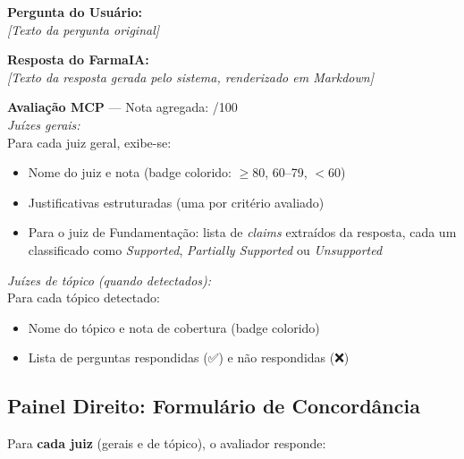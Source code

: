 \documentclass[12pt,a4paper]{article}
\begin{document}
\begin{framed}
\noindent\textbf{Pergunta do Usuário:}\\[2pt]
\textit{[Texto da pergunta original]}
\end{framed}

\begin{framed}
\noindent\textbf{Resposta do FarmaIA:}\\[2pt]
\textit{[Texto da resposta gerada pelo sistema, renderizado em Markdown]}
\end{framed}

\begin{framed}
\noindent\textbf{Avaliação MCP} --- Nota agregada: \framebox[2cm]{\rule{0pt}{5mm}}/100\\[4pt]

\noindent\textit{Juízes gerais:}\\[2pt]
Para cada juiz geral, exibe-se:
\begin{itemize}[leftmargin=12pt,itemsep=2pt]
  \item Nome do juiz e nota (badge colorido: {\color{farmaigreen}$\geq$80},
    {\color{evalamber}60--79}, {\color{evalred}$<$60})
  \item Justificativas estruturadas (uma por critério avaliado)
  \item Para o juiz de Fundamentação: lista de \textit{claims}
    extraídos da resposta, cada um classificado como
    {\color{farmaigreen}\textit{Supported}},
    {\color{evalamber}\textit{Partially Supported}} ou
    {\color{evalred}\textit{Unsupported}}
\end{itemize}

\noindent\textit{Juízes de tópico (quando detectados):}\\[2pt]
Para cada tópico detectado:
\begin{itemize}[leftmargin=12pt,itemsep=2pt]
  \item Nome do tópico e nota de cobertura (badge colorido)
  \item Lista de perguntas respondidas (✅) e não respondidas (❌)
\end{itemize}
\end{framed}

\vspace{3mm}
\subsection*{Painel Direito: Formulário de Concordância}

Para \textbf{cada juiz} (gerais e de tópico), o avaliador responde:
\end{document}
